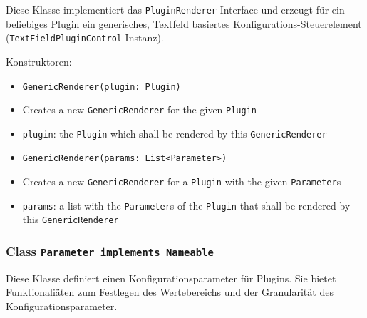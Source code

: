 \documentclass[parskip=full,11pt]{scrartcl}
\begin{document}
Diese Klasse implementiert das \texttt{PluginRenderer}-Interface und erzeugt für ein beliebiges Plugin ein generisches, Textfeld basiertes Konfigurations-Steuerelement (\texttt{TextFieldPluginControl}-Instanz).

Konstruktoren:

\begin{itemize}\itemsep -10pt
	\item \texttt{GenericRenderer(plugin: Plugin)}
	\item[] Creates a new \texttt{GenericRenderer} for the given \texttt{Plugin}
	\item[] \texttt{plugin}: the \texttt{Plugin} which shall be rendered by this \texttt{GenericRenderer}
	
	\item \texttt{GenericRenderer(params: List<Parameter>)}
	\item[] Creates a new \texttt{GenericRenderer} for a \texttt{Plugin} with the given \texttt{Parameter}s
	\item[] \texttt{params}: a list with the \texttt{Parameter}s of the \texttt{Plugin} that shall be rendered by this \texttt{GenericRenderer}
\end{itemize} 

\subsubsection{Class \texttt{Parameter implements Nameable}}

Diese Klasse definiert einen Konfigurationsparameter für Plugins. Sie bietet Funktionaliäten zum Festlegen des Wertebereichs und der Granularität des Konfigurationsparameter.
\end{document}
